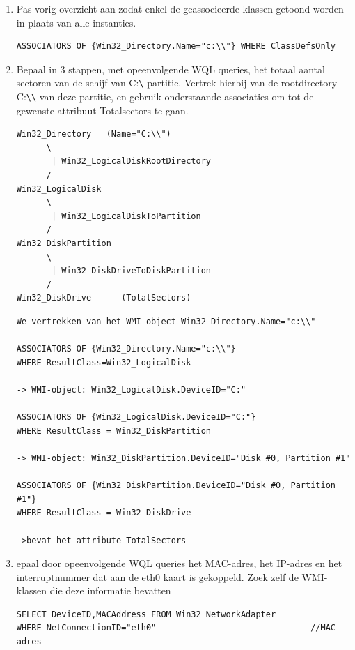 \documentclass[11pt,a4paper]{report}
\begin{document}
\begin{enumerate}[resume]
	\item Pas vorig overzicht aan zodat enkel de geassocieerde klassen getoond worden in plaats van alle instanties.
	\begin{lstlisting}
ASSOCIATORS OF {Win32_Directory.Name="c:\\"} WHERE ClassDefsOnly 
	\end{lstlisting}
	\item Bepaal in 3 stappen, met opeenvolgende WQL queries, het totaal aantal sectoren van de schijf van C:\verb+\+ partitie.
	Vertrek hierbij van de rootdirectory C:\verb+\+\verb+\+ van deze partitie, en gebruik onderstaande associaties om tot de gewenste attribuut Totalsectors te gaan.
	\begin{lstlisting}
Win32_Directory   (Name="C:\\")
      \ 
       | Win32_LogicalDiskRootDirectory
      / 
Win32_LogicalDisk   
      \ 
       | Win32_LogicalDiskToPartition
      / 
Win32_DiskPartition 
      \ 
       | Win32_DiskDriveToDiskPartition
      / 
Win32_DiskDrive      (TotalSectors)
	\end{lstlisting}
	\begin{lstlisting}
We vertrekken van het WMI-object Win32_Directory.Name="c:\\"

ASSOCIATORS OF {Win32_Directory.Name="c:\\"} 
WHERE ResultClass=Win32_LogicalDisk

-> WMI-object: Win32_LogicalDisk.DeviceID="C:"

ASSOCIATORS OF {Win32_LogicalDisk.DeviceID="C:"}
WHERE ResultClass = Win32_DiskPartition

-> WMI-object: Win32_DiskPartition.DeviceID="Disk #0, Partition #1"

ASSOCIATORS OF {Win32_DiskPartition.DeviceID="Disk #0, Partition #1"}
WHERE ResultClass = Win32_DiskDrive

->bevat het attribute TotalSectors
	\end{lstlisting}
	\item epaal door opeenvolgende WQL queries het MAC-adres, het IP-adres en het interruptnummer dat aan de eth0 kaart is gekoppeld. Zoek zelf de WMI-klassen die deze informatie bevatten
	\begin{lstlisting}
SELECT DeviceID,MACAddress FROM Win32_NetworkAdapter          
WHERE NetConnectionID="eth0"                               //MAC-adres


\end{lstlisting}
\end{enumerate}
\end{document}
